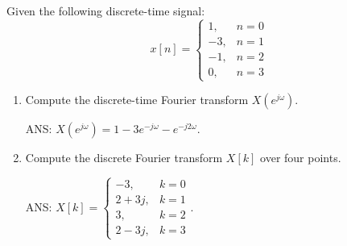 \begin{q}{}
    Given the following discrete-time signal:
    \[
        x[n] = 
        \begin{cases}
            1, & n=0 \\
            -3, & n=1 \\
            -1, & n=2 \\
            0, & n=3
        \end{cases}
    \]
    \begin{enumerate}[label=(\alph*)]
        \item Compute the discrete-time Fourier transform $X(e^{j\omega})$.
        \begin{flushright}
        \begin{blueenv}
            ANS: $X(e^{j\omega}) = 1 - 3e^{-j\omega} - e^{-j2\omega}$.
        \end{blueenv}
        \end{flushright}
        
        \item Compute the discrete Fourier transform $X[k]$ over four points.
        \begin{flushright}
        \begin{blueenv}
            ANS: $X[k] = 
            \begin{cases}
                -3, & k = 0\\
                2+3j, & k = 1\\
                3, & k=2 \\
                2-3j, & k=3
            \end{cases}.$
        \end{blueenv}
        \end{flushright}
        
    \end{enumerate}
\end{q}





